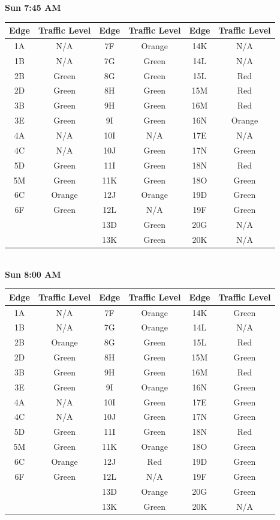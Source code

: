\documentclass{article}
\begin{document}
\textbf{Sun 7:45 AM} \\

\begin{tabular}{|c|c||c|c||c|c|}\hline
Edge & Traffic Level & Edge & Traffic Level & Edge & Traffic Level \\ \hline
1A & N/A & 7F & Orange & 14K & N/A \\ 
1B & N/A & 7G & Green & 14L & N/A \\ \hline
2B & Green & 8G & Green & 15L & Red \\ 
2D & Green & 8H & Green & 15M & Red \\ \hline
3B & Green & 9H & Green & 16M & Red \\ 
3E & Green & 9I & Green & 16N & Orange \\ \hline 
4A & N/A & 10I & N/A & 17E & N/A \\ 
4C & N/A & 10J & Green & 17N & Green \\ \hline
5D & Green & 11I & Green & 18N & Red \\ 
5M & Green & 11K & Green & 18O & Green \\ \hline 
6C & Orange & 12J & Orange & 19D & Green \\ 
6F & Green & 12L & N/A & 19F & Green \\ \hline 
& & 13D & Green & 20G & N/A \\
& & 13K & Green & 20K & N/A \\ \hline
\end{tabular} \\

\textbf{Sun 8:00 AM} \\

\begin{tabular}{|c|c||c|c||c|c|}\hline
Edge & Traffic Level & Edge & Traffic Level & Edge & Traffic Level \\ \hline
1A & N/A & 7F & Orange & 14K & Green \\ 
1B & N/A & 7G & Orange & 14L & N/A \\ \hline
2B & Orange & 8G & Green & 15L & Red \\ 
2D & Green & 8H & Green & 15M & Green \\ \hline
3B & Green & 9H & Green & 16M & Red \\ 
3E & Green & 9I & Orange & 16N & Green \\ \hline 
4A & N/A & 10I & Green & 17E & Green \\ 
4C & N/A & 10J & Green & 17N & Green \\ \hline
5D & Green & 11I & Green & 18N & Red \\ 
5M & Green & 11K & Orange & 18O & Green \\ \hline 
6C & Orange & 12J & Red & 19D & Green \\ 
6F & Green & 12L & N/A & 19F & Green \\ \hline 
& & 13D & Orange & 20G & Green \\
& & 13K & Green & 20K & N/A \\ \hline
\end{tabular} \\
\end{document}
